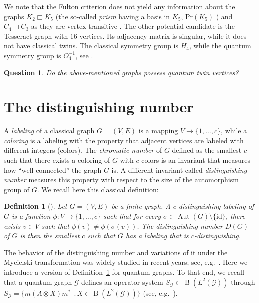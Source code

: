 \documentclass[11pt,reqno]{amsart}
\newtheorem{definition}[proposition]{Definition}
\newtheorem{question}[proposition]{Question}
\newcommand{\id}{\mathrm{id}}
\newcommand{\tens}{\otimes}
\DeclareMathOperator{\Aut}{Aut}
\DeclareMathOperator{\B}{B}
\begin{document}
We note that the Fulton criterion does not yield any information about the graphs $K_2\Box K_5$ (the so-called {\it prism} having a basis in $K_5$, $\mathrm{Pr}(K_5)$ \cite[Definition 4.2]{Banica07}) and $C_4\Box C_3$ as they are vertex-transitive \cite[Remark 2.7]{Weber22}. The other potential candidate is the Tesseract graph with $16$ vertices. Its adjacency matrix is singular, while it does not have classical twins. The classical symmetry group is $H_4$, while the quantum symmetry group is $O_4^{-1}$, see \cite{BanBichColl07}.

\begin{question}
Do the above-mentioned graphs possess quantum twin vertices?
\end{question}

\section{The distinguishing number}\label{sec:dist}

A \emph{labeling} of a classical graph $G=(V,E)$ is a mapping $V\to\{1,\dotsc,c\}$, while a \emph{coloring} is a labeling with the property that adjacent vertices are labeled with different integers (colors). The \emph{chromatic number} of $G$ defined as the smallest $c$ such that there exists a coloring of $G$ with $c$ colors is an invariant that measures how ``well connected'' the graph $G$ is. A different invariant called \emph{distinguishing number} measures this property with respect to the size of the automorphism group of $G$. We recall here this classical definition:

\begin{definition}[{\cite{AlbertsonCollins96}}]\label{def:dist}
Let $G=(V,E)$ be a finite graph. A $c$-distinguishing labeling of $G$ is a function $\phi\colon V\to\{1,\dotsc,c\}$ such that for every $\sigma\in\Aut(G)\setminus\{\id\}$, there exists $v\in V$ such that $\phi(v)\neq\phi(\sigma(v))$. The distinguishing number $D(G)$ of $G$ is then the smallest $c$ such that $G$ has a labeling that is $c$-distinguishing.
\end{definition}

The behavior of the distinguishing number and variations of it under the Mycielski transformation was widely studied in recent years; see, e.g.~\cite{Alikhani19, Kennedy24}. Here we introduce a version of Definition~\ref{def:dist} for quantum graphs. To that end, we recall that a quantum graph $\mathcal{G}$ defines an operator system $S_{\scriptscriptstyle\mathcal{G}}\subset\B(L^2(\mathcal{G}))$ through $S_{\scriptscriptstyle\mathcal{G}}=\bigl\{m(A\tens{X})m^*\,\bigr|\bigl.\,X\in\B(L^2(\mathcal{G}))\bigr\}$ (see, e.g.~\cite[Section 2.4]{Ganesan}).
\end{document}
